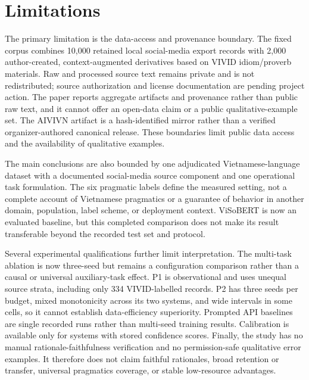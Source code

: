 \section{Limitations}
\label{sec:limitations}

The primary limitation is the data-access and provenance boundary.  The fixed corpus combines 10,000 retained local social-media export records with 2,000 author-created, context-augmented derivatives based on VIVID idiom/proverb materials.  Raw and processed source text remains private and is not redistributed; source authorization and license documentation are pending project action.  The paper reports aggregate artifacts and provenance rather than public raw text, and it cannot offer an open-data claim or a public qualitative-example set.  The AIVIVN artifact is a hash-identified mirror rather than a verified organizer-authored canonical release.  These boundaries limit public data access and the availability of qualitative examples.

The main conclusions are also bounded by one adjudicated Vietnamese-language dataset with a documented social-media source component and one operational task formulation. The six pragmatic labels define the measured setting, not a complete account of Vietnamese pragmatics or a guarantee of behavior in another domain, population, label scheme, or deployment context. ViSoBERT is now an evaluated baseline, but this completed comparison does not make its result transferable beyond the recorded test set and protocol.

Several experimental qualifications further limit interpretation. The multi-task ablation is now three-seed but remains a configuration comparison rather than a causal or universal auxiliary-task effect. P1 is observational and uses unequal source strata, including only 334 VIVID-labelled records. P2 has three seeds per budget, mixed monotonicity across its two systems, and wide intervals in some cells, so it cannot establish data-efficiency superiority. Prompted API baselines are single recorded runs rather than multi-seed training results. Calibration is available only for systems with stored confidence scores. Finally, the study has no manual rationale-faithfulness verification and no permission-safe qualitative error examples. It therefore does not claim faithful rationales, broad retention or transfer, universal pragmatics coverage, or stable low-resource advantages.

